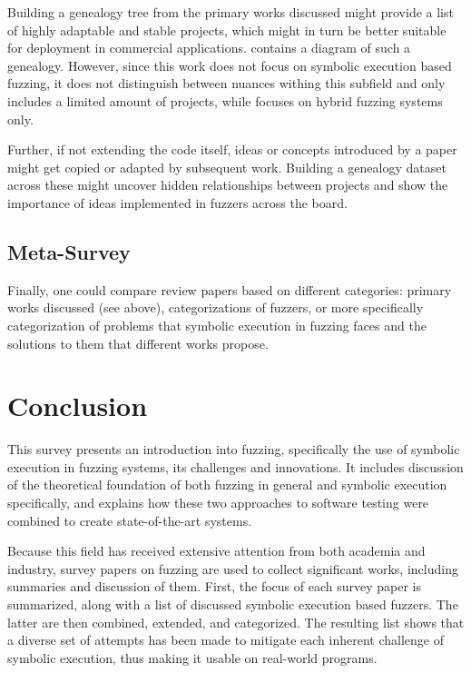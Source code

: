 \documentclass{article}
\begin{document}
\begin{multicols}{2}
    Building a genealogy tree from the primary works discussed might provide a list of highly adaptable and stable projects, which might in turn be better suitable for deployment in commercial applications. \cite{ArtScienceEng} contains a diagram of such a genealogy. However, since this work does not focus on symbolic execution based fuzzing, it does not distinguish between nuances withing this subfield and only includes a limited amount of projects, while \cite{Hybrid} focuses on hybrid fuzzing systems only.

    Further, if not extending the code itself, ideas or concepts introduced by a paper might get copied or adapted by subsequent work. Building a genealogy dataset across these might uncover hidden relationships between projects and show the importance of ideas implemented in fuzzers across the board.

    \subsection{Meta-Survey}
    Finally, one could compare review papers based on different categories: primary works discussed (see above), categorizations of fuzzers, or more specifically categorization of problems that symbolic execution in fuzzing faces and the solutions to them that different works propose.

    \section{Conclusion}
    \label{Conclusion}
    This survey presents an introduction into fuzzing, specifically the use of symbolic execution in fuzzing systems, its challenges and innovations. It includes discussion of the theoretical foundation of both fuzzing in general and symbolic execution specifically, and explains how these two approaches to software testing were combined to create state-of-the-art systems.

    Because this field has received extensive attention from both academia and industry, survey papers on fuzzing are used to collect significant works, including summaries and discussion of them. First, the focus of each survey paper is summarized, along with a list of discussed symbolic execution based fuzzers. The latter are then combined, extended, and categorized. The resulting list shows that a diverse set of attempts has been made to mitigate each inherent challenge of symbolic execution, thus making it usable on real-world programs.


\end{multicols}
\end{document}

